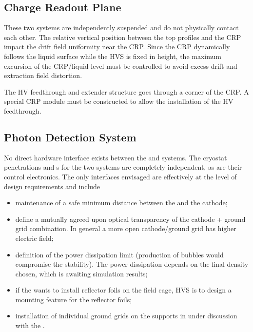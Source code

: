 
\subsection{Charge Readout Plane}
\label{sec:fddp-hv-intfc-to-crp}

These two systems are independently suspended and do not physically contact each other.  The relative vertical position between the top  profiles and the CRP impact the drift field uniformity near the CRP.  Since the CRP  dynamically follows the liquid surface while the HVS is fixed in height, the maximum excursion of the CRP/liquid level must be controlled to avoid excess drift and extraction field distortion.

The HV feedthrough and extender structure goes through a corner of the CRP.  A special CRP module must be constructed to allow the installation of the HV feedthrough.


\subsection{Photon Detection System}
\label{sec:fddp-hv-intfc-to-pds}

No direct hardware interface exists between the  and  systems. The cryostat penetrations and \fdth{}s for the two systems are completely independent, as are their control electronics. The only interfaces envisaged are effectively at the level of design requirements and include 
\begin{itemize}
    \item maintenance of a safe minimum distance between the  and the \dptargetdriftvoltneg cathode;
    \item define a mutually agreed upon optical transparency of the cathode + ground grid combination.  In general a more open cathode/ground grid has higher electric field;
    \item  definition of the  power dissipation limit (production of bubbles would compromise the  stability). The power dissipation depends on the final  density chosen, which is awaiting simulation results;
    \item if the  wants to install reflector foils on the field cage, HVS is to design a mounting feature for the reflector foils;
    \item installation of individual ground grids on the  supports in under discussion with the .
\end{itemize}


